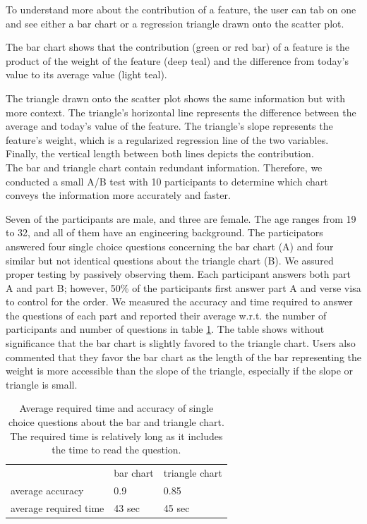 \documentclass[conference]{IEEEtran}
\begin{document}
To understand more about the contribution of a feature, the user can tab on one and see either a bar chart or a regression triangle drawn onto the scatter plot.

The bar chart shows that the contribution (green or red bar) of a feature is the product of the weight of the feature (deep teal) and the difference from today's value to its average value (light teal). 

The triangle drawn onto the scatter plot shows the same information but with more context. 
The triangle's horizontal line represents the difference between the average and today's value of the feature. The triangle's slope represents the feature's weight, which is a regularized regression line of the two variables. Finally, the vertical length between both lines depicts the contribution.\\

The bar and triangle chart contain redundant information. Therefore, we conducted a small A/B test with 10 participants to determine which chart conveys the information more accurately and faster. 

Seven of the participants are male, and three are female. The age ranges from 19 to 32, and all of them have an engineering background. 
The participators answered four single choice questions concerning the bar chart (A) and four similar but not identical questions about the triangle chart (B). We assured proper testing by passively observing them. Each participant answers both part A and part B; however, 50\% of the participants first answer part A and verse visa to control for the order. We measured the accuracy and time required to answer the questions of each part and reported their average w.r.t. the number of participants and number of questions in table \ref{tab:study}. The table shows without significance that the bar chart is slightly favored to the triangle chart.
Users also commented that they favor the bar chart as the length of the bar representing the weight is more accessible than the slope of the triangle, especially if the slope or triangle is small.


\begin{table}[]
\begin{tabular}{lll}
\textbf{}             & bar chart & triangle chart \\
average accuracy      & 0.9       & 0.85           \\
average required time & 43 sec    & 45 sec        
\end{tabular}
    \caption{Average required time and accuracy of single choice questions about the bar and triangle chart. The required time is relatively long as it includes the time to read the question.}
    \label{tab:study}
\end{table}
\end{document}

